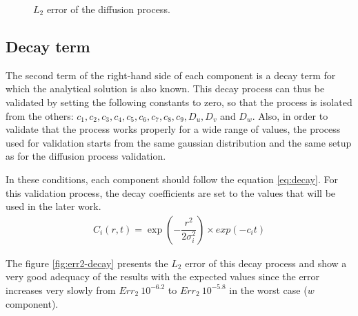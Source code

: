 \documentclass[a4paper]{article}
\begin{document}
\begin{figure}
\label{fig:err2-diffusion}
\caption{$L_2$ error of the diffusion process.}
\end{figure}


\subsection{Decay term}

The second term of the right-hand side of each component is a decay term for which the analytical solution is also known. This decay process can thus be validated by setting the following constants to zero, so that the process is isolated from the others: $c_1, c_2, c_3, c_4, c_5, c_6, c_7, c_8, c_9, D_u, D_v$ and $D_w$. Also, in order to validate that the process works properly for a wide range of values, the process used for validation starts from the same gaussian distribution and the same setup as for the diffusion process validation.

In these conditions, each component should follow the equation \ref{eq:decay}. For this validation process, the decay coefficients are set to the values that will be used in the later work.
\begin{align}
\label{eq:decay}
	C_i(r, t)= \exp \left(- \dfrac{r^2}{2 \sigma^2_i} \right) \times exp(-c_i t)
\end{align}

The figure \ref{fig:err2-decay} presents the $L_2$ error of this decay process and show a very good adequacy of the results with the expected values since the error increases very slowly from $Err_2 ~ 10^{-6.2}$ to $Err_2 ~ 10^{-5.8}$ in the worst case ($w$ component).
\end{document}
